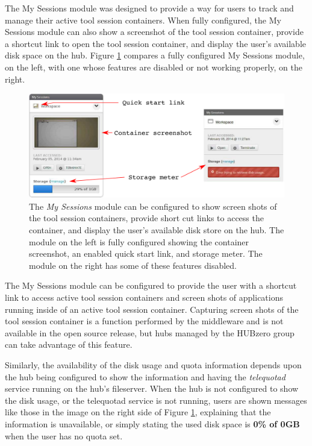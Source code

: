 \documentclass[letterpaper]{scrartcl}
\begin{document}
The My Sessions module was designed to provide a way for users to track and
manage their active tool session containers. When fully configured, the My
Sessions module can also show a screenshot of the tool session container,
provide a shortcut link to open the tool session container, and display the
user's available disk space on the hub. Figure
\ref{fig:my_sessions_module_compare} compares a fully configured My Sessions
module, on the left, with one whose features are disabled or not working
properly, on the right.

\begin{figure}[ht]
  \centering
  \includegraphics[width=\textwidth]
    {../../images/eps/hub+configuration+dashboard+my+sessions+2.pdf}
  \caption{ The \textit{My Sessions} module can be configured to show
            screen shots of the tool session containers, provide short
            cut links to access the container, and display the user's
            available disk store on the hub. The module on the left
            is fully configured showing the container screenshot, an
            enabled quick start link, and storage meter. The module
            on the right has some of these features disabled.}
  \label{fig:my_sessions_module_compare}
\end{figure}

The My Sessions module can be configured to provide the user with a shortcut
link to access active tool session containers and screen shots of applications
running inside of an active tool session container.  Capturing screen shots of
the tool session container is a function performed by the middleware and is not
available in the open source release, but hubs managed by the HUBzero group can
take advantage of this feature.

Similarly, the availability of the disk usage and quota information depends
upon the hub being configured to show the information and having the
\textit{telequotad}
service running on the hub's fileserver. When the hub is not configured to show
the disk usage, or the telequotad service is not running, users are shown
messages like those in the image on the right side of Figure
\ref{fig:my_sessions_module_compare}, explaining that the information is
unavailable, or simply stating the used disk space is \textbf{0\% of 0GB} when
the user has no quota set.
\end{document}
